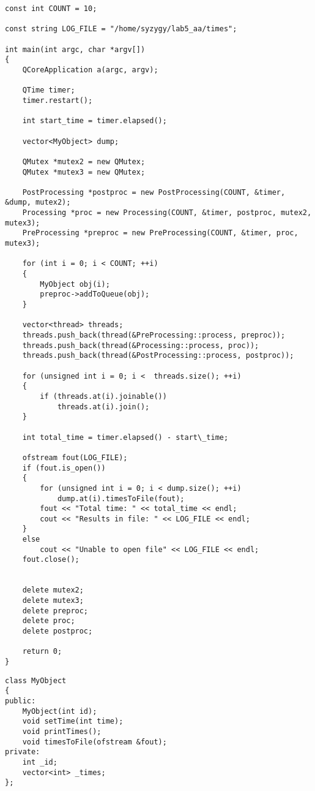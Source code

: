 \documentclass[a4paper,14pt]{report}
\begin{document}
\begin{lstlisting}[label=some-code,caption=Запуск конвейера]
const int COUNT = 10;

const string LOG_FILE = "/home/syzygy/lab5_aa/times";

int main(int argc, char *argv[])
{
    QCoreApplication a(argc, argv);

    QTime timer;
    timer.restart();

    int start_time = timer.elapsed();

    vector<MyObject> dump;

    QMutex *mutex2 = new QMutex;
    QMutex *mutex3 = new QMutex;

    PostProcessing *postproc = new PostProcessing(COUNT, &timer, &dump, mutex2);
    Processing *proc = new Processing(COUNT, &timer, postproc, mutex2, mutex3);
    PreProcessing *preproc = new PreProcessing(COUNT, &timer, proc, mutex3);

    for (int i = 0; i < COUNT; ++i)
    {
        MyObject obj(i);
        preproc->addToQueue(obj);
    }

    vector<thread> threads;
    threads.push_back(thread(&PreProcessing::process, preproc));
    threads.push_back(thread(&Processing::process, proc));
    threads.push_back(thread(&PostProcessing::process, postproc));

    for (unsigned int i = 0; i <  threads.size(); ++i)
    {
        if (threads.at(i).joinable())
            threads.at(i).join();
    }

    int total_time = timer.elapsed() - start\_time;

    ofstream fout(LOG_FILE);
    if (fout.is_open())
    {
        for (unsigned int i = 0; i < dump.size(); ++i)
            dump.at(i).timesToFile(fout);
        fout << "Total time: " << total_time << endl;
        cout << "Results in file: " << LOG_FILE << endl;
    }
    else
        cout << "Unable to open file" << LOG_FILE << endl;
    fout.close();


    delete mutex2;
    delete mutex3;
    delete preproc;
    delete proc;
    delete postproc;

    return 0;
}
\end{lstlisting}

\begin{lstlisting}[label=some-code,caption=Объявление класса MyObject]
class MyObject
{
public:
    MyObject(int id);
    void setTime(int time);
    void printTimes();
    void timesToFile(ofstream &fout);
private:
    int _id;
    vector<int> _times;
};
\end{lstlisting}
\end{document}
